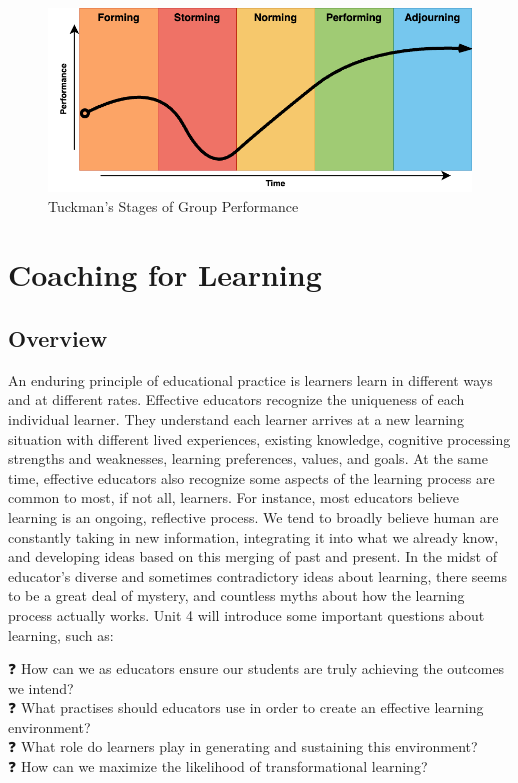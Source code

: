 \documentclass[
]{book}
\begin{document}
\begin{figure}
\centering
\includegraphics{assets/presentations/facilitation/tuckman.drawio.png}
\caption{Tuckman's Stages of Group Performance}
\end{figure}

\hypertarget{coaching-for-learning}{%
\chapter{Coaching for Learning}\label{coaching-for-learning}}

\hypertarget{overview-2}{%
\section*{Overview}\label{overview-2}}

An enduring principle of educational practice is learners learn in different ways and at different rates. Effective educators recognize the uniqueness of each individual learner. They understand each learner arrives at a new learning situation with different lived experiences, existing knowledge, cognitive processing strengths and weaknesses, learning preferences, values, and goals. At the same time, effective educators also recognize some aspects of the learning process are common to most, if not all, learners. For instance, most educators believe learning is an ongoing, reflective process. We tend to broadly believe human are constantly taking in new information, integrating it into what we already know, and developing ideas based on this merging of past and present. In the midst of educator's diverse and sometimes contradictory ideas about learning, there seems to be a great deal of mystery, and countless myths about how the learning process actually works. Unit 4 will introduce some important questions about learning, such as:

❓ How can we as educators ensure our students are truly achieving the outcomes we intend?\\
❓ What practises should educators use in order to create an effective learning environment?\\
❓ What role do learners play in generating and sustaining this environment?\\
❓ How can we maximize the likelihood of transformational learning?
\end{document}
